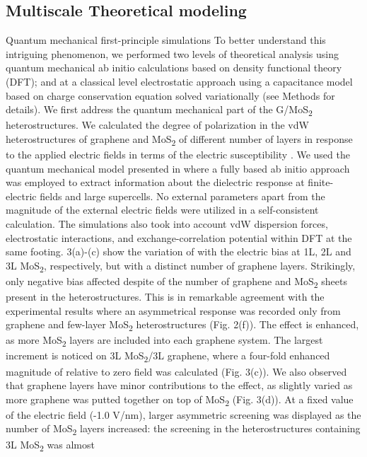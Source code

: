 \subsection{Multiscale Theoretical modeling}
Quantum mechanical first-principle simulations To better understand
this intriguing phenomenon, we performed two levels of theoretical
analysis using quantum mechanical ab initio calculations based on
density functional theory (DFT); and at a classical level
electrostatic approach using a capacitance model based on charge
conservation equation solved variationally (see Methods for
details). We first address the quantum mechanical part of the G/MoS\textsubscript{2}
heterostructures. We calculated the degree of polarization in the vdW
heterostructures of graphene and MoS\textsubscript{2} of different number of layers in
response to the applied electric fields in terms of the electric
susceptibility . We used the quantum mechanical model presented in
\cite{Santos_2013_tunable_eps_gr,Santos_2013_ACSnano_kaxi} where a
fully based ab initio approach was employed to extract information
about the dielectric response at finite-electric fields and large
supercells. No external parameters apart from the magnitude of the
external electric fields were utilized in a self-consistent
calculation. The simulations also took into account vdW dispersion
forces, electrostatic interactions, and exchange-correlation potential
within DFT at the same footing.   3(a)-(c) show the variation of
with the electric bias at 1L, 2L and 3L MoS\textsubscript{2}, respectively, but with a
distinct number of graphene layers. Strikingly, only negative bias
affected despite of the number of graphene and MoS\textsubscript{2} sheets present in
the heterostructures. This is in remarkable agreement with the
experimental results where an asymmetrical response was recorded only
from graphene and few-layer MoS\textsubscript{2} heterostructures (Fig. 2(f)). The
effect is enhanced, as more MoS\textsubscript{2} layers are included into each
graphene system. The largest increment is noticed on 3L MoS\textsubscript{2}/3L
graphene, where a four-fold enhanced magnitude of relative to zero
field was calculated (Fig. 3(c)). We also observed that graphene
layers have minor contributions to the effect, as slightly varied as
more graphene was putted together on top of MoS\textsubscript{2} (Fig. 3(d)). At a
fixed value of the electric field (-1.0 V/nm), larger asymmetric
screening was displayed as the number of MoS\textsubscript{2} layers increased: the
screening in the heterostructures containing 3L MoS\textsubscript{2} was almost
